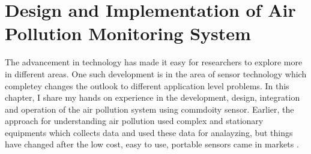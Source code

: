 \documentclass[11pt]{article}
\begin{document}
\section*{Design and Implementation of Air Pollution Monitoring System}

The advancement in technology has made it easy for researchers to explore more in different areas. One such development is in the area of sensor technology which completey changes the outlook to different application level problems. In this chapter, I share my hands on experience in the development, design, integration and operation of the air pollution system using commdoity sensor. Earlier, the approach for understanding air pollution used complex and stationary equipments which collects data and used these data for analayzing, but things have changed after the low cost, easy to use, portable sensors came in markets \cite{Snyder2013}. 



\end{document}
